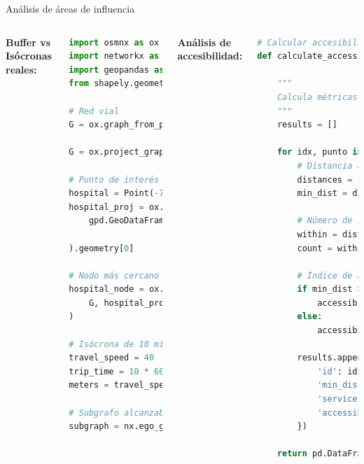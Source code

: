 \documentclass[10pt,aspectratio=169]{beamer}
\begin{document}
\begin{frame}[fragile]{Análisis de áreas de influencia}
    \begin{columns}[T]
        \textbf{Buffer vs Isócronas reales:}
        \begin{lstlisting}[language=Python]
import osmnx as ox
import networkx as nx
import geopandas as gpd
from shapely.geometry import Point

# Red vial
G = ox.graph_from_place('Santiago, Chile', 
                        network_type='drive')
G = ox.project_graph(G)

# Punto de interés (ej: hospital)
hospital = Point(-70.65, -33.45)
hospital_proj = ox.project_gdf(
    gpd.GeoDataFrame([1], geometry=[hospital], 
                    crs='EPSG:4326')
).geometry[0]

# Nodo más cercano
hospital_node = ox.nearest_nodes(
    G, hospital_proj.x, hospital_proj.y
)

# Isócrona de 10 minutos
travel_speed = 40  # km/h
trip_time = 10 * 60  # 10 min en segundos
meters = travel_speed * 1000 / 60 / 60 * trip_time

# Subgrafo alcanzable
subgraph = nx.ego_graph(G, hospital_node, 
                        radius=meters, 
                        distance='length')
        \end{lstlisting}
        
        \textbf{Análisis de accesibilidad:}
        \begin{lstlisting}[language=Python]
# Calcular accesibilidad a servicios
def calculate_accessibility(puntos, servicios, 
                           max_distance=2000):
    """
    Calcula métricas de accesibilidad
    """
    results = []
    
    for idx, punto in puntos.iterrows():
        # Distancia al servicio más cercano
        distances = servicios.distance(punto.geometry)
        min_dist = distances.min()
        
        # Número de servicios en radio
        within = distances <= max_distance
        count = within.sum()
        
        # Índice de accesibilidad
        if min_dist > 0:
            accessibility = count / (min_dist / 1000)
        else:
            accessibility = count * 10
            
        results.append({
            'id': idx,
            'min_distance': min_dist,
            'services_count': count,
            'accessibility_index': accessibility
        })
    
    return pd.DataFrame(results)
        \end{lstlisting}
    \end{columns}
\end{frame}
\end{document}
